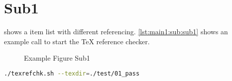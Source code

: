 \section[Sub1]{Sub1}\label{main1:sub:sub1}

 shows a item list with different referencing. \autoref{lst:main1:sub:sub1} shows an example call to start the TeX reference checker.


\begin{figure}[!h]
    \caption[{Main1; Sub; Sub1}]{Example Figure Sub1}
    \label{fig:main1:sub:sub1}
\end{figure}


\begin{lstlisting}[language=bash,caption={Start texrefchk}, label=lst:main1:sub:sub1]
./texrefchk.sh --texdir=./test/01_pass
\end{lstlisting}
